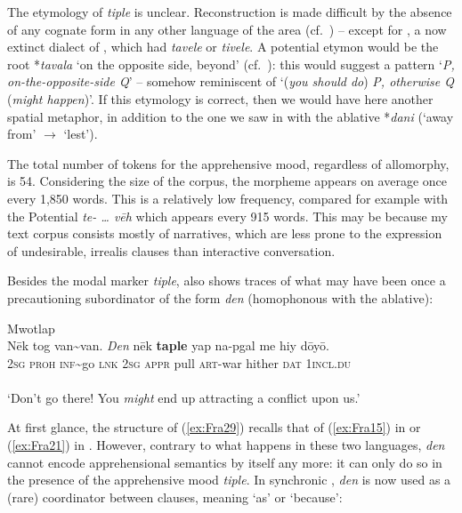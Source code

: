 \documentclass[output=paper,colorlinks,citecolor=brown]{langscibook}
\begin{document}
The etymology of \textit{tiple} is unclear. Reconstruction is made difficult by the absence of any cognate form in any other language of the area (cf.\ ) -- except for , a now extinct dialect of , which had \textit{tavele} or \textit{tivele}. A potential etymon would be the root *\textit{tavala} `on the opposite side, beyond' (cf.\ \citealt[194]{Clark2009}): this would suggest a pattern `\textit{P, on-the-opposite-side Q}' -- somehow reminiscent of  `(\textit{you should do}) \textit{P, otherwise Q} (\textit{might happen})'. If this etymology is correct, then we would have here another spatial metaphor, in addition to the one we saw in  with the ablative *\textit{dani} (`away from' ${\rightarrow}$ `lest'). 

The total number of tokens for the apprehensive mood, regardless of allomorphy, is 54. Considering the size of the corpus, the morpheme appears on average once every 1,850 words. This is a relatively low frequency, compared for example with the Potential  \textit{te- {\ldots} vēh} which appears every 915 words. This may be because my text corpus consists mostly of narratives, which are less prone to the expression of undesirable, irrealis clauses than interactive conversation.

Besides the modal marker \textit{tiple},  also shows traces of what may have been once a precautioning subordinator of the form \textit{den} (homophonous with the ablative):
 
\ea \label{ex:Fra29} \textnormal{Mwotlap}  \\
\gll Nēk tog van\textasciitilde van. \textit{Den} nēk \textbf{taple} yap na-pgal me hiy dōyō. \\
\textsc{2sg} \textsc{proh} \textsc{inf}\textasciitilde go \textsc{lnk} \textsc{2sg} \textsc{appr} pull \textsc{art}-war hither \textsc{dat} \textsc{1incl.du} \\
 \\
`Don't go there! You \textit{might} end up attracting a conflict upon us.' 
\z

\noindent At first glance, the structure of (\ref{ex:Fra29}) recalls that of (\ref{ex:Fra15}) in  or (\ref{ex:Fra21}) in . However, contrary to what happens in these two languages,  \textit{den} cannot encode apprehensional semantics by itself any more: it can only do so in the presence of the apprehensive mood \textit{tiple}. In synchronic , \textit{den} is now used as a (rare) coordinator between clauses, meaning `as' or `because':
 
\end{document}

